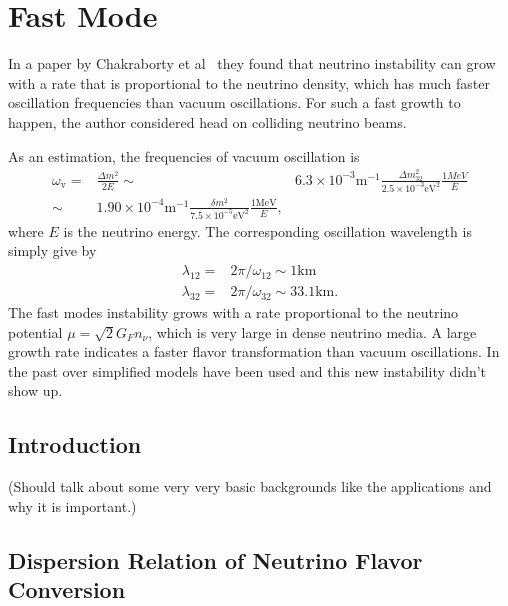\section{\label{chap:dr-sec:fast-mode}Fast Mode}


In a paper by Chakraborty et al~\cite{Chakraborty2016} they found that neutrino instability can grow with a rate that is proportional to the neutrino density, which has much faster oscillation frequencies than vacuum oscillations. For such a fast growth to happen, the author considered head on colliding neutrino beams.

As an estimation, the frequencies of vacuum oscillation is
\begin{align*}
   \omega_{\mathrm v} =& \frac{\Delta m^2}{2E}\sim& 6.3\times 10^{-3} \mathrm{m}^{-1}  \frac{\Delta m^2_{32}}{2.5\times 10^{-3} \mathrm{eV}^2 } \frac{1MeV}{E} \\
   \sim & 1.90\times 10^{-4}  \mathrm{m}^{-1}  \frac{\delta m^2}{7.5\times 10^{-5}\mathrm{eV}^2} \frac{1\mathrm{MeV}}{E},
\end{align*}
where $E$ is the neutrino energy. The corresponding oscillation wavelength is simply give by
\begin{align*}
   \lambda_{12} = & 2\pi/\omega_{12} \sim 1 \mathrm{km}\\
   \lambda_{32} = & 2\pi/\omega_{32} \sim 33.1 \mathrm{km}.
\end{align*}
The fast modes instability grows with a rate proportional to the neutrino potential $\mu=\sqrt{2}G_F n_\nu$, which is very large in dense neutrino media. A large growth rate indicates a faster flavor transformation than vacuum oscillations. In the past over simplified models have been used and this new instability didn't show up.




\subsection{\label{chap:dr-sec:fast-mode-subsec:introduction}Introduction}

(Should talk about some very very basic backgrounds like the applications and why it is important.)





\subsection{\label{chap:dr-sec:fast-mode-subsec:dr}Dispersion Relation of Neutrino Flavor Conversion}

